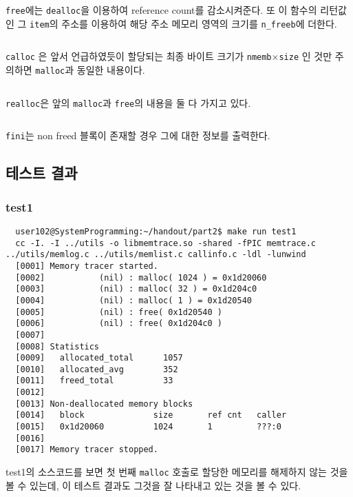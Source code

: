 \documentclass{report}
\begin{document}
\inputminted[firstline=45,lastline=51, linenos]{C}{2019-13674.224747/part2/memtrace.c}
\lstinline{free}에는 \lstinline{dealloc}을 이용하여 reference count를 감소시켜준다. 또 이 함수의 리턴값인 그 \lstinline{item}의 주소를 이용하여 해당 주소 메모리 영역의 크기를 \lstinline{n_freeb}에 더한다.

\inputminted[firstline=53,lastline=63, linenos]{C}{2019-13674.224747/part2/memtrace.c}
\lstinline{calloc} 은 앞서 언급하였듯이 할당되는 최종 바이트 크기가 \lstinline{nmemb}$\times$\lstinline{size} 인 것만 주의하면 \lstinline{malloc}과 동일한 내용이다.

\inputminted[firstline=64,lastline=76, linenos]{C}{2019-13674.224747/part2/memtrace.c}
\lstinline{realloc}은 앞의 \lstinline{malloc}과 \lstinline{free}의 내용을 둘 다 가지고 있다.

\inputminted[firstline=120,lastline=142, linenos]{C}{2019-13674.224747/part2/memtrace.c}
\lstinline{fini}는 non freed 블록이 존재할 경우 그에 대한 정보를 출력한다.

\subsection{테스트 결과}
\subsubsection{test1}
\begin{verbatim}
  user102@SystemProgramming:~/handout/part2$ make run test1
  cc -I. -I ../utils -o libmemtrace.so -shared -fPIC memtrace.c ../utils/memlog.c ../utils/memlist.c callinfo.c -ldl -lunwind
  [0001] Memory tracer started.
  [0002]           (nil) : malloc( 1024 ) = 0x1d20060
  [0003]           (nil) : malloc( 32 ) = 0x1d204c0
  [0004]           (nil) : malloc( 1 ) = 0x1d20540
  [0005]           (nil) : free( 0x1d20540 )
  [0006]           (nil) : free( 0x1d204c0 )
  [0007]
  [0008] Statistics
  [0009]   allocated_total      1057
  [0010]   allocated_avg        352
  [0011]   freed_total          33
  [0012]
  [0013] Non-deallocated memory blocks
  [0014]   block              size       ref cnt   caller
  [0015]   0x1d20060          1024       1         ???:0
  [0016]
  [0017] Memory tracer stopped.
\end{verbatim}
test1의 소스코드를 보면 첫 번째 \lstinline{malloc} 호출로 할당한 메모리를 해제하지 않는 것을 볼 수 있는데, 이 테스트 결과도 그것을 잘 나타내고 있는 것을 볼 수 있다.
\end{document}
